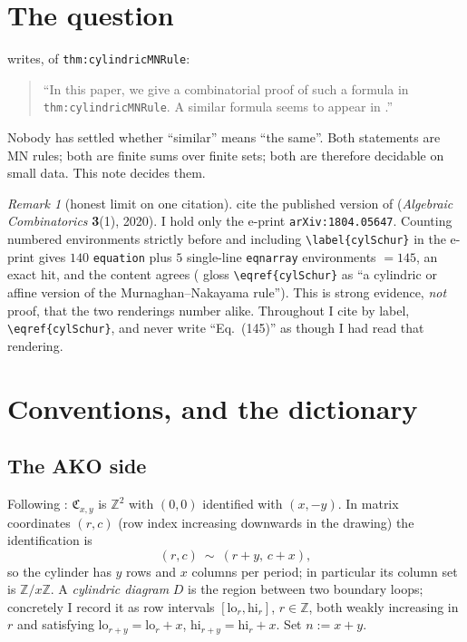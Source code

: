 \documentclass[11pt]{article}
\theoremstyle{plain}
\theoremstyle{definition}
\theoremstyle{remark}
\newtheorem{remark}[theorem]{Remark}
\newcommand{\CC}{\mathfrak{C}}
\begin{document}
\section{The question}

\cite[src l.\,232]{AKO} writes, of \texttt{thm:cylindricMNRule}:
\begin{quote}
``In this paper, we give a combinatorial proof of such a formula in \texttt{thm:cylindricMNRule}.
A similar formula seems to appear in \cite[Eq.~(145)]{KP}.''
\end{quote}
Nobody has settled whether ``similar'' means ``the same''. Both statements are MN rules; both are
finite sums over finite sets; both are therefore decidable on small data. This note decides them.

\begin{remark}[honest limit on one citation]
\cite{AKO} cite the published version of \cite{KP} (\emph{Algebraic Combinatorics} \textbf{3}(1),
2020). I hold only the e-print \texttt{arXiv:1804.05647}. Counting numbered environments strictly
before and including \verb|\label{cylSchur}| in the e-print gives $140$ \texttt{equation} plus $5$
single-line \texttt{eqnarray} environments $=145$, an exact hit, and the content agrees (\cite{KP}
gloss \verb|\eqref{cylSchur}| as ``a cylindric or affine version of the Murnaghan--Nakayama rule'').
This is strong evidence, \emph{not} proof, that the two renderings number alike. Throughout I cite
by label, \verb|\eqref{cylSchur}|, and never write ``Eq.~(145)'' as though I had read that rendering.
\end{remark}

\section{Conventions, and the dictionary}\label{sec:dict}

\subsection{The AKO side}

Following \cite[l.\,313--330, 462--472]{AKO}: $\CC_{x,y}$ is $\mathbb{Z}^2$ with $(0,0)$ identified
with $(x,-y)$. In matrix coordinates $(r,c)$ (row index increasing downwards in the drawing) the
identification is
\begin{equation}\label{eq:shift}
  (r,c)\ \sim\ (r+y,\,c+x),
\end{equation}
so the cylinder has $y$ rows and $x$ columns per period; in particular its column set is
$\mathbb{Z}/x\mathbb{Z}$. A \emph{cylindric diagram} $D$ is the region between two boundary loops;
concretely I record it as row intervals $[\mathrm{lo}_r,\mathrm{hi}_r]$, $r\in\mathbb{Z}$, both
weakly increasing in $r$ and satisfying $\mathrm{lo}_{r+y}=\mathrm{lo}_r+x$,
$\mathrm{hi}_{r+y}=\mathrm{hi}_r+x$. Set $n:=x+y$.
\end{document}
